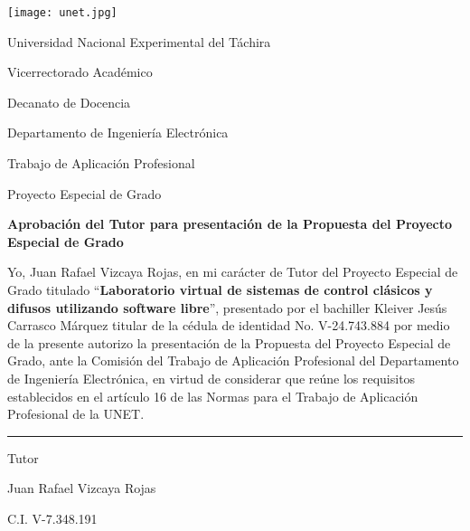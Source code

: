 \begin{titlepage}
\setcounter{page}{4}

\begin{center}
	\begin{spacing}{1.5}
	\texttt{[image: unet.jpg]}
	
	Universidad Nacional Experimental del Táchira 
	
	Vicerrectorado Académico
	
	Decanato de Docencia
	
	Departamento de Ingeniería Electrónica
	
	Trabajo de Aplicación Profesional
	
	Proyecto Especial de Grado
	\end{spacing}
\end{center}

\vspace{0.5cm}

\begin{center}
		
		\textbf{Aprobación del Tutor para presentación de la Propuesta del Proyecto Especial de Grado}
		
\end{center}

\vspace{0.5cm}

\begin{spacing}{1.5}
	Yo, Juan Rafael Vizcaya Rojas, en mi carácter de Tutor del Proyecto Especial de Grado titulado \enquote{\textbf{Laboratorio virtual de sistemas de control clásicos y difusos utilizando software libre}}, presentado por el bachiller Kleiver Jesús Carrasco Márquez titular de la cédula de identidad No. \mbox{V-24.743.884} por medio de la presente autorizo la presentación de la Propuesta del Proyecto Especial de Grado, ante la Comisión del Trabajo de Aplicación Profesional del Departamento de Ingeniería Electrónica, en virtud de considerar que reúne los requisitos establecidos en el artículo 16 de las Normas para el Trabajo de Aplicación Profesional de la UNET.
\end{spacing}

\vfill

\begin{center}
	
	\rule{6cm}{1pt}
	
	\vspace{0.2cm}
	
	Tutor
	
	Juan Rafael Vizcaya Rojas
	
	\setlength{\parskip}{0pt}
	
	C.I. V-7.348.191
\end{center}

\vspace{0.5cm}
\end{titlepage}